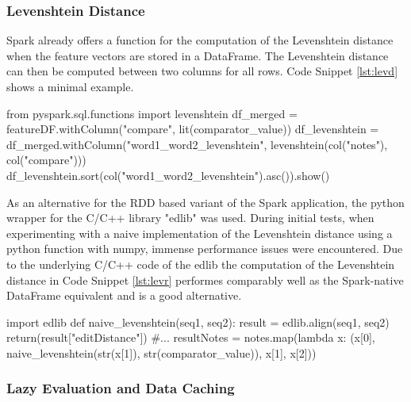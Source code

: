 \subsubsection{Levenshtein Distance}

Spark already offers a function for the computation of the Levenshtein distance when the feature vectors are stored in a DataFrame. The Levenshtein distance can then be computed between two columns for all rows. Code Snippet \ref{lst:levd} shows a minimal example. 

\begin{pythonCode}[frame=single,label={lst:levd},caption={Levenshtein DataFrame},captionpos=b]
from pyspark.sql.functions import levenshtein 
df_merged = featureDF.withColumn("compare", lit(comparator_value)) 
df_levenshtein = df_merged.withColumn("word1_word2_levenshtein", levenshtein(col("notes"), col("compare")))
df_levenshtein.sort(col("word1_word2_levenshtein").asc()).show()
\end{pythonCode}

\noindent As an alternative for the RDD based variant of the Spark application, the python wrapper for the C/C++ library "edlib" was used. During initial tests, when experimenting with a naive implementation of the Levenshtein distance using a python function with numpy, immense performance issues were encountered. Due to the underlying C/C++ code of the edlib the computation of the Levenshtein distance in Code Snippet \ref{lst:levr} performes comparably well as the Spark-native DataFrame equivalent and is a good alternative. 

\begin{pythonCode}[frame=single,label={lst:levr},caption={Levenshtein RDD},captionpos=b]
import edlib
def naive_levenshtein(seq1, seq2):
    result = edlib.align(seq1, seq2)
    return(result["editDistance"])
#...
resultNotes = notes.map(lambda x: (x[0], naive_levenshtein(str(x[1]), str(comparator_value)), x[1], x[2]))
\end{pythonCode}

\subsubsection{Lazy Evaluation and Data Caching}\label{leval}

